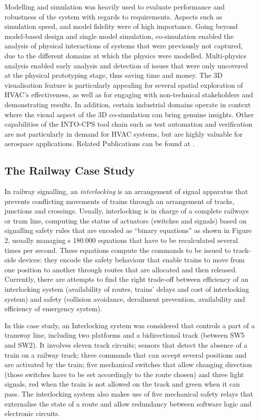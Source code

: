 Modelling and simulation was heavily used to evaluate performance and robustness of the system with regards to requirements. Aspects such as simulation speed, and model fidelity were of high importance. Going beyond model-based design and single model simulation, co-simulation enabled the analysis of physical interactions of systems that were previously not captured, due to the different domains at which the physics were modelled. Multi-physics analysis enabled early analysis and detection of issues that were only uncovered at the physical prototyping stage, thus saving time and money. The 3D visualisation feature is particularly appealing for several spatial exploration of HVAC's effectiveness, as well as for engaging with non-technical stakeholders and demonstrating results. In addition, certain industrial domains operate in context where the visual aspect of the 3D co-simulation can bring genuine insights. Other capabilities of the INTO-CPS tool chain such as test automation and verification are not particularly in demand for HVAC systems, but are highly valuable for aerospace applications. Related Publications can be found at \cite{Fitzgerald&16,Couto&17}.

\subsection{The Railway Case Study}

In railway signalling, an \emph{interlocking} is an arrangement of signal apparatus that prevents conflicting movements of trains through an arrangement of tracks, junctions and crossings. Usually, interlocking is in charge of a complete railways or tram line, computing the status of actuators (switches and signals) based on signalling safety rules that are encoded as ``binary equations'' as shown in Figure 2, usually managing s 180.000 equations that have to be recalculated several times per second. These equations compute the commands to be issued to track-side devices: they encode the safety behaviour that enable trains to move from one position to another through routes that are allocated and then released. Currently, there are attempts to find the right trade-off between efficiency of an interlocking system (availability of routes, trains' delays and cost of interlocking system) and safety (collision avoidance, derailment prevention, availability and efficiency of emergency system).

In this case study, an Interlocking system was considered that controls a part of a tramway line, including two platforms and a bidirectional track (between SW5 and SW2). It involves eleven track circuits; sensors that detect the absence of a train on a railway track; three commands that can accept several positions and are activated by the train; five mechanical switches that allow changing direction (those switches have to be set accordingly to the route chosen) and three light signals, red when the train is not allowed on the track and green when it can pass. The interlocking system also makes use of five mechanical safety relays that externalise the state of a route and allow redundancy between software logic and electronic circuits.

